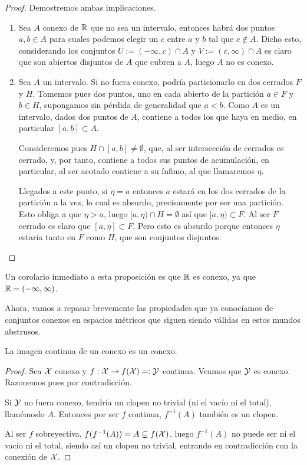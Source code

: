 \begin{proof}
	Demostremos ambas implicaciones.
	\begin{enumerate}
		\item[\bra] Sea $A$ conexo de $\mathbb{R}$ que no sea un intervalo, entonces habrá dos puntos $a,b\in A$ para cuales podemos elegir un $c$ entre $a$ y $b$ tal que $c\not\in A$. Dicho esto, considerando los conjuntos $U:=(-\infty,c)\cap A$ y $V:=(c,\infty)\cap A$ es claro que son abiertos disjuntos de $A$ que cubren a $A$, luego $A$ no es conexo. 
		\item[\bla] Sea $A$ un intervalo. Si no fuera conexo, podría particionarlo en dos cerrados $F$ y $H$. Tomemos pues dos puntos, uno en cada abierto de la partición $a\in F$ y $b\in H$, supongamos sin pérdida de generalidad que $a<b$. Como $A$ es un intervalo, dados dos puntos de $A$, contiene a todos los que haya en medio, en particular $[a,b]\subset A$.
		
		Consideremos pues $H\cap[a,b]\not=\emptyset$, que, al ser intersección de cerrados es cerrado, y, por tanto, contiene a todos sus puntos de acumulación, en particular, al ser acotado contiene a su ínfimo, al que llamaremos $\eta$.
		
		Llegados a este punto, si $\eta=a$ entonces $a$ estará en los dos cerrados de la partición a la vez, lo cual es absurdo, precisamente por ser una partición. Esto obliga a que $\eta > a$, luego $[a,\eta)\cap H=\emptyset$ así que $[a,\eta)\subset F$. Al ser $F$ cerrado es claro que $[a,\eta]\subset F$. Pero esto es absurdo porque entonces $\eta$ estaría tanto en $F$ como $H$, que son conjuntos disjuntos.\qedhere
	\end{enumerate}
\end{proof}
Un corolario inmediato a esta proposición es que $\mathbb{R}$ es conexo, ya que $\mathbb{R}=(-\infty,\infty)$.

Ahora, vamos a repasar brevemente las propiedades que ya conocíamos de conjuntos conexos en espacios métricos que siguen siendo válidas en estos mundos abstrusos.

\begin{prop}
	\label{conex_prop_im_continua}
	La imagen continua de un conexo es un conexo.
\end{prop}
\begin{proof}
	Sea $\mathcal{X}$ conexo y $f:\mathcal{X}\to f(\mathcal{X})=:\mathcal{Y}$ continua. Veamos que $\mathcal{Y}$ es conexo. Razonemos pues por contradicción.
	
	Si $\mathcal{Y}$ no fuera conexo, tendría un clopen no trivial (ni el vacío ni el total), llamémoslo $A$. Entonces por ser $f$ continua, $f^{-1}(A)$ también es un clopen.
	
	Al ser $f$ sobreyectiva, $f(f^{-1}(A))=A\subsetneq f(\mathcal{X})$, luego $f^{-1}(A)$ no puede ser ni el vacío ni el total, siendo así un clopen no trivial, entrando en contradicción con la conexión de $\mathcal{X}$.
\end{proof}

